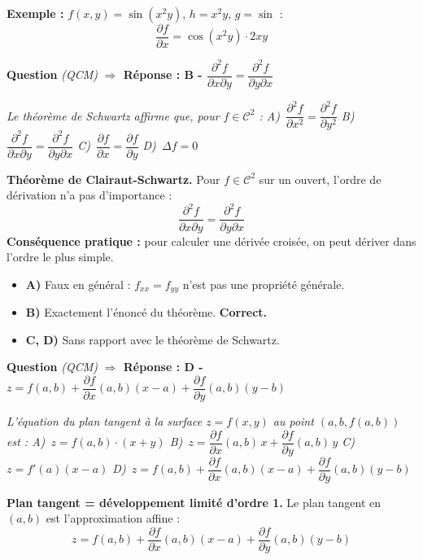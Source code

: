 \documentclass[11pt,a4paper]{article}
\newcounter{qnum}
\newcommand{\qtitre}[2]{%
  \stepcounter{qnum}%
  \medskip\noindent
  \textbf{\color{bleutexte}Question \theqnum}\enspace
  \textit{(#1)}\enspace
  \textcolor{vertok}{\textbf{$\Rightarrow$ Réponse : #2}}
  \par\smallskip
}
\newcommand{\qenonce}[1]{%
  \begin{mdframed}[backgroundcolor=grisbox, linewidth=0pt,
    innerleftmargin=8pt, innerrightmargin=8pt,
    innertopmargin=5pt, innerbottommargin=5pt,
    skipabove=2pt, skipbelow=4pt]
  \small\textit{#1}
  \end{mdframed}
}
\begin{document}
\textbf{Exemple :} $f(x,y) = \sin(x^2 y)$, $h = x^2 y$, $g = \sin$ :
$$\frac{\partial f}{\partial x} = \cos(x^2y)\cdot 2xy$$

\qtitre{QCM}{B - $\dfrac{\partial^2 f}{\partial x\partial y} = \dfrac{\partial^2 f}{\partial y\partial x}$}
\qenonce{Le théorème de Schwartz affirme que, pour $f \in \mathcal{C}^2$ :
\quad A)~$\dfrac{\partial^2 f}{\partial x^2} = \dfrac{\partial^2 f}{\partial y^2}$
\quad B)~$\dfrac{\partial^2 f}{\partial x\partial y} = \dfrac{\partial^2 f}{\partial y\partial x}$
\quad C)~$\dfrac{\partial f}{\partial x} = \dfrac{\partial f}{\partial y}$
\quad D)~$\Delta f = 0$}

\begin{methodebox}
\textbf{Théorème de Clairaut-Schwartz.} Pour $f\in\mathcal{C}^2$ sur un ouvert, l'ordre de dérivation n'a pas d'importance :
$$\frac{\partial^2 f}{\partial x\partial y} = \frac{\partial^2 f}{\partial y\partial x}$$
\textbf{Conséquence pratique :} pour calculer une dérivée croisée, on peut dériver dans l'ordre le plus simple.
\end{methodebox}

\begin{itemize}[leftmargin=1.5em, itemsep=2pt]
  \item \textcolor{rougeerr}{\textbf{A)}} Faux en général : $f_{xx} = f_{yy}$ n'est pas une propriété générale.
  \item \textcolor{vertok}{\textbf{B)}} Exactement l'énoncé du théorème. \textbf{Correct.}
  \item \textcolor{rougeerr}{\textbf{C, D)}} Sans rapport avec le théorème de Schwartz.
\end{itemize}

\qtitre{QCM}{D - $z = f(a,b) + \dfrac{\partial f}{\partial x}(a,b)(x-a) + \dfrac{\partial f}{\partial y}(a,b)(y-b)$}
\qenonce{L'équation du plan tangent à la surface $z = f(x,y)$ au point $(a,b,f(a,b))$ est :
\quad A)~$z = f(a,b)\cdot(x+y)$
\quad B)~$z = \dfrac{\partial f}{\partial x}(a,b)\,x + \dfrac{\partial f}{\partial y}(a,b)\,y$
\quad C)~$z = f'(a)(x-a)$
\quad D)~$z = f(a,b) + \dfrac{\partial f}{\partial x}(a,b)(x-a) + \dfrac{\partial f}{\partial y}(a,b)(y-b)$}

\begin{methodebox}
\textbf{Plan tangent = développement limité d'ordre 1.} Le plan tangent en $(a,b)$ est l'approximation affine :
$$z = f(a,b) + \frac{\partial f}{\partial x}(a,b)(x-a) + \frac{\partial f}{\partial y}(a,b)(y-b)$$
\end{methodebox}
\end{document}
